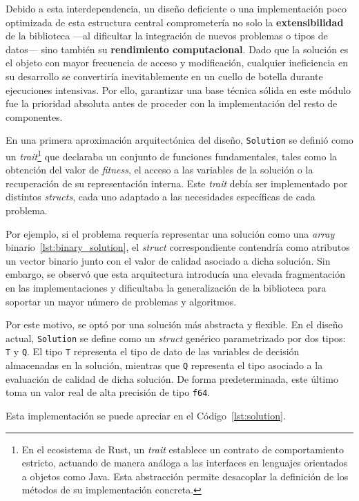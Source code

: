 \documentclass[12pt,a4paper,twoside,openright]{book}
\begin{document}
        Debido a esta interdependencia, un diseño deficiente o una implementación poco optimizada de esta estructura central comprometería no solo la \textbf{extensibilidad} de la biblioteca —al dificultar la integración de nuevos problemas o tipos de datos— sino también su \textbf{rendimiento computacional}. Dado que la solución es el objeto con mayor frecuencia de acceso y modificación, cualquier ineficiencia en su desarrollo se convertiría inevitablemente en un cuello de botella durante ejecuciones intensivas. Por ello, garantizar una base técnica sólida en este módulo fue la prioridad absoluta antes de proceder con la implementación del resto de componentes.

        En una primera aproximación arquitectónica del diseño, \texttt{Solution} se definió como un \textit{trait}\footnote{En el ecosistema de Rust, un \textit{trait} establece un contrato de comportamiento estricto, actuando de manera análoga a las interfaces en lenguajes orientados a objetos como Java. Esta abstracción permite desacoplar la definición de los métodos de su implementación concreta.} que declaraba un conjunto de funciones fundamentales, tales como la obtención del valor de \textit{fitness}, el acceso a las variables de la solución o la recuperación de su representación interna. Este \textit{trait} debía ser implementado por distintos \textit{structs}, cada uno adaptado a las necesidades específicas de cada problema.

        Por ejemplo, si el problema requería representar una solución como una \textit{array} binario~\ref{lst:binary_solution}, el \textit{struct} correspondiente contendría como atributos un vector binario junto con el valor de calidad asociado a dicha solución. Sin embargo, se observó que esta arquitectura introducía una elevada fragmentación en las implementaciones y dificultaba la generalización de la biblioteca para soportar un mayor número de problemas y algoritmos.

        Por este motivo, se optó por una solución más abstracta y flexible. En el diseño actual, \texttt{Solution} se define como un \textit{struct} genérico parametrizado por dos tipos: \texttt{T} y \texttt{Q}. El tipo \texttt{T} representa el tipo de dato de las variables de decisión almacenadas en la solución, mientras que \texttt{Q} representa el tipo asociado a la evaluación de calidad de dicha solución. De forma predeterminada, este último toma un valor real de alta precisión de tipo \texttt{f64}. 
        
        Esta implementación se puede apreciar en el Código~\ref{lst:solution}.
\end{document}
